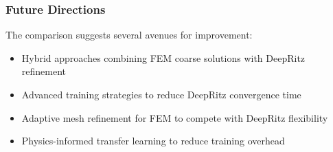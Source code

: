 \subsubsection{Future Directions}

The comparison suggests several avenues for improvement:
\begin{itemize}
    \item Hybrid approaches combining FEM coarse solutions with DeepRitz refinement
    \item Advanced training strategies to reduce DeepRitz convergence time
    \item Adaptive mesh refinement for FEM to compete with DeepRitz flexibility
    \item Physics-informed transfer learning to reduce training overhead
\end{itemize}